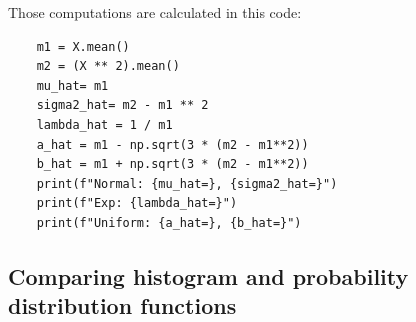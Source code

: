 \documentclass[12pt,a4paper]{article} %
\begin{document}
Those computations are calculated in this code:

\begin{lstlisting}
    m1 = X.mean()
    m2 = (X ** 2).mean()
    mu_hat= m1
    sigma2_hat= m2 - m1 ** 2
    lambda_hat = 1 / m1
    a_hat = m1 - np.sqrt(3 * (m2 - m1**2))
    b_hat = m1 + np.sqrt(3 * (m2 - m1**2))
    print(f"Normal: {mu_hat=}, {sigma2_hat=}")
    print(f"Exp: {lambda_hat=}")
    print(f"Uniform: {a_hat=}, {b_hat=}")
\end{lstlisting}

\pagebreak

\subsection{Comparing histogram and probability distribution functions}
\end{document}
